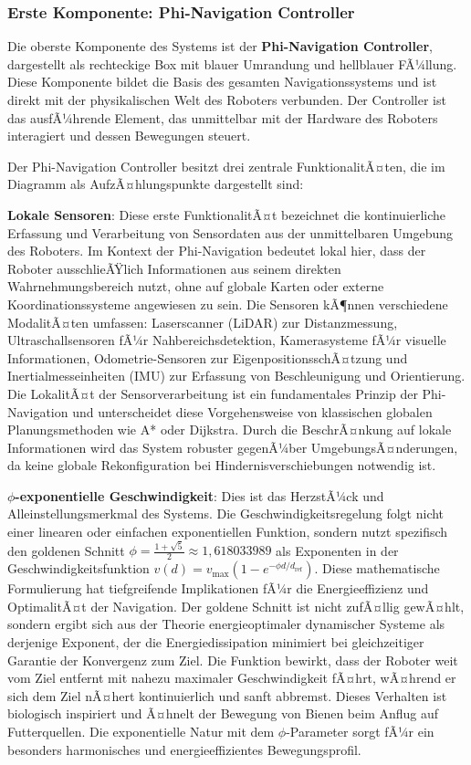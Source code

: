 ﻿\documentclass[a4paper,12pt]{article}
\theoremstyle{definition}
\begin{document}
\subsubsection{Erste Komponente: Phi-Navigation Controller}

Die oberste Komponente des Systems ist der \textbf{Phi-Navigation Controller}, dargestellt als rechteckige Box mit blauer Umrandung und hellblauer FÃ¼llung. Diese Komponente bildet die Basis des gesamten Navigationssystems und ist direkt mit der physikalischen Welt des Roboters verbunden. Der Controller ist das ausfÃ¼hrende Element, das unmittelbar mit der Hardware des Roboters interagiert und dessen Bewegungen steuert.

Der Phi-Navigation Controller besitzt drei zentrale FunktionalitÃ¤ten, die im Diagramm als AufzÃ¤hlungspunkte dargestellt sind:

\textbf{Lokale Sensoren}: Diese erste FunktionalitÃ¤t bezeichnet die kontinuierliche Erfassung und Verarbeitung von Sensordaten aus der unmittelbaren Umgebung des Roboters. Im Kontext der Phi-Navigation bedeutet lokal hier, dass der Roboter ausschlieÃŸlich Informationen aus seinem direkten Wahrnehmungsbereich nutzt, ohne auf globale Karten oder externe Koordinationssysteme angewiesen zu sein. Die Sensoren kÃ¶nnen verschiedene ModalitÃ¤ten umfassen: Laserscanner (LiDAR) zur Distanzmessung, Ultraschallsensoren fÃ¼r Nahbereichsdetektion, Kamerasysteme fÃ¼r visuelle Informationen, Odometrie-Sensoren zur EigenpositionsschÃ¤tzung und Inertialmesseinheiten (IMU) zur Erfassung von Beschleunigung und Orientierung. Die LokalitÃ¤t der Sensorverarbeitung ist ein fundamentales Prinzip der Phi-Navigation und unterscheidet diese Vorgehensweise von klassischen globalen Planungsmethoden wie A* oder Dijkstra. Durch die BeschrÃ¤nkung auf lokale Informationen wird das System robuster gegenÃ¼ber UmgebungsÃ¤nderungen, da keine globale Rekonfiguration bei Hindernisverschiebungen notwendig ist.

\textbf{$\phi$-exponentielle Geschwindigkeit}: Dies ist das HerzstÃ¼ck und Alleinstellungsmerkmal des Systems. Die Geschwindigkeitsregelung folgt nicht einer linearen oder einfachen exponentiellen Funktion, sondern nutzt spezifisch den goldenen Schnitt $\phi = \frac{1+\sqrt{5}}{2} \approx 1{,}618033989$ als Exponenten in der Geschwindigkeitsfunktion $v(d) = v_{\max}(1 - e^{-\phi d/d_{\text{ref}}})$. Diese mathematische Formulierung hat tiefgreifende Implikationen fÃ¼r die Energieeffizienz und OptimalitÃ¤t der Navigation. Der goldene Schnitt ist nicht zufÃ¤llig gewÃ¤hlt, sondern ergibt sich aus der Theorie energieoptimaler dynamischer Systeme als derjenige Exponent, der die Energiedissipation minimiert bei gleichzeitiger Garantie der Konvergenz zum Ziel. Die Funktion bewirkt, dass der Roboter weit vom Ziel entfernt mit nahezu maximaler Geschwindigkeit fÃ¤hrt, wÃ¤hrend er sich dem Ziel nÃ¤hert kontinuierlich und sanft abbremst. Dieses Verhalten ist biologisch inspiriert und Ã¤hnelt der Bewegung von Bienen beim Anflug auf Futterquellen. Die exponentielle Natur mit dem $\phi$-Parameter sorgt fÃ¼r ein besonders harmonisches und energieeffizientes Bewegungsprofil.
\end{document}
